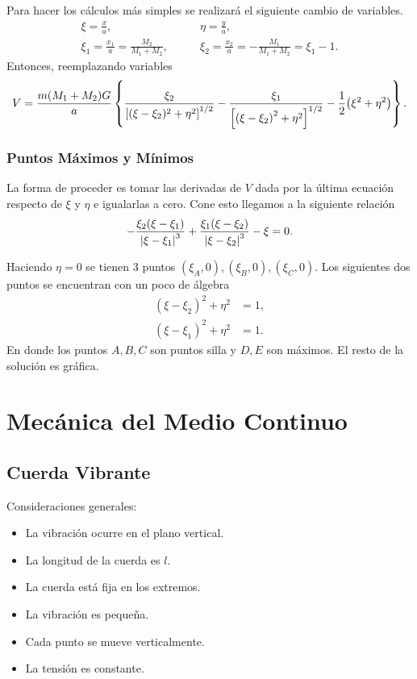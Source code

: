Para hacer los cálculos más simples se realizará el siguiente cambio de variables.
\begin{align*}
	\xi = \frac{x}{a}, &\qquad \eta = \frac{y}{a}, \\
	\xi _1 = \frac{x_1}{a} = \frac{M_2}{M_1 + M_2}, &\qquad \xi _2 = \frac{x_2}{a} = -\frac{M_1}{M_1 + M_2} = \xi _1 - 1.
\end{align*}
Entonces, reemplazando variables
\begin{equation}
	V = \frac{m (M_1 + M_2) G}{a} \left\{ \frac{\xi _2}{\qty[(\xi - \xi _2)^2 + \eta ^2]^{1/2}} - \frac{\xi _1}{\qty[\qty(\xi - \xi _2)^2 + \eta ^2]^{1/2}} - \frac{1}{2} \qty(\xi ^2 + \eta ^2) \right\} .
\end{equation}

\subsection{Puntos Máximos y Mínimos}
La forma de proceder es tomar las derivadas de $V$ dada por la última ecuación respecto de $\xi$ y $\eta$ e igualarlas a cero. Cone esto llegamos a la siguiente relación
	\begin{equation}
		-\frac{\xi _2 (\xi - \xi _1)}{\abs{\xi - \xi _1}^3} + \frac{\xi _1 (\xi - \xi _2)}{\abs{\xi - \xi _2}^3} - \xi = 0.
	\end{equation}

Haciendo $\eta = 0$ se tienen $3$ puntos $(\xi _A ,0), (\xi _B ,0), (\xi _C ,0)$. Los siguientes dos puntos se encuentran con un poco de álgebra
\begin{align*}
	(\xi - \xi _2)^2 + \eta ^2 &= 1, \\
	(\xi - \xi _1)^2 + \eta ^2 &= 1.
\end{align*}
En donde los puntos $A,B,C$ son puntos silla y $D,E$ son máximos. El resto de la solución es gráfica.





\chapter{Mecánica del Medio Continuo}
\section{Cuerda Vibrante}
Consideraciones generales:
\begin{itemize}
	\item La vibración ocurre en el plano vertical.
	\item La longitud de la cuerda es $l$.
	\item La cuerda está fija en los extremos.
	\item La vibración es pequeña.
	\item Cada punto se mueve verticalmente.
	\item La tensión es constante.
\end{itemize}

